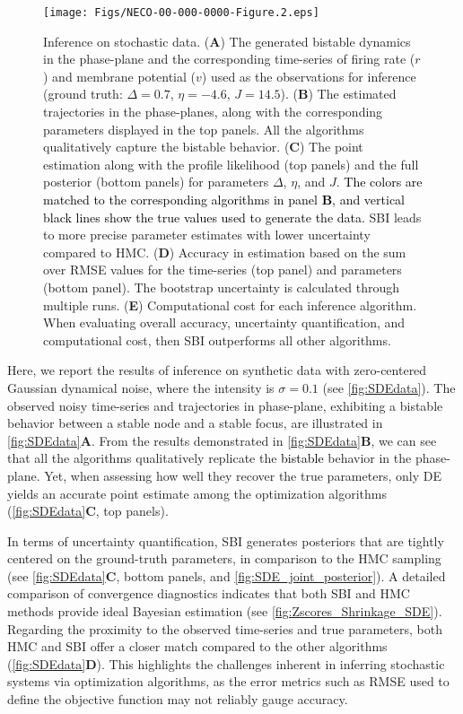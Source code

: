 \documentclass[12pt]{article}
\begin{document}
\begin{figure}[p]
    \centering
    \texttt{[image: Figs/NECO-00-000-0000-Figure.2.eps]}
    \caption{Inference on stochastic data.  (\textbf{A}) The generated bistable dynamics in the phase-plane and the corresponding time-series of firing rate ($r$) and membrane potential ($v$) used as the observations for inference (ground truth: $\Delta=0.7$, $\eta=-4.6$, $J=14.5$).  (\textbf{B}) The estimated trajectories in the phase-planes, along with the corresponding parameters displayed in the top panels. All the algorithms qualitatively capture the bistable behavior. (\textbf{C}) The point estimation along with the profile likelihood (top panels) and the full posterior (bottom panels) for parameters $\Delta$, $\eta$, and $J$. \textcolor{black}{The colors are matched to the corresponding algorithms in panel \textbf{B}, and vertical black lines show the true values used to generate the data.} SBI leads to more precise parameter estimates with lower uncertainty compared to HMC. (\textbf{D}) Accuracy in estimation based on the sum over RMSE values for the time-series (top panel) and parameters (bottom panel). The bootstrap uncertainty is calculated through multiple runs. (\textbf{E}) Computational cost for each inference algorithm.  When evaluating overall accuracy, uncertainty quantification, and computational cost, then SBI outperforms all other algorithms.
    }
    \label{fig:SDEdata}
\end{figure}


Here, we report the results of inference on synthetic data with zero-centered Gaussian dynamical noise, where the intensity is $\sigma = 0.1$  (see \autoref{fig:SDEdata}).
The observed noisy time-series and trajectories in phase-plane, exhibiting a bistable behavior between a stable node and a stable focus, are illustrated in \autoref{fig:SDEdata}\textbf{A}. From the results demonstrated in \autoref{fig:SDEdata}\textbf{B}, we can see that all the algorithms qualitatively replicate the \textcolor{black}{bistable} behavior in the phase-plane. Yet, when assessing how well they recover the true parameters, only DE yields an accurate point estimate among the optimization algorithms (\autoref{fig:SDEdata}\textbf{C}, top panels). 

In terms of uncertainty quantification, SBI generates posteriors that are tightly centered on the ground-truth parameters, in comparison to the HMC sampling (see \autoref{fig:SDEdata}\textbf{C}, bottom panels, and \autoref{fig:SDE_joint_posterior}). A detailed comparison of convergence diagnostics indicates that both SBI and HMC methods provide ideal Bayesian estimation (see \autoref{fig:Zscores_Shrinkage_SDE}).
Regarding the proximity to the observed time-series and true parameters, both HMC and SBI offer a closer match compared to the other algorithms (\autoref{fig:SDEdata}\textbf{D}). This highlights the challenges inherent in inferring stochastic systems via optimization algorithms, as the error metrics such as RMSE used to define the objective function may not reliably gauge accuracy. 
\end{document}
